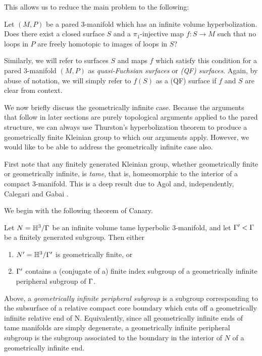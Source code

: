 This allows us to reduce the main problem to the following:

\begin{prob}

Let $(M,P)$ be a pared $3$-manifold which has an infinite volume
hyperbolization. Does there exist a closed surface $S$ and a $\pi_1$-injective
map $f \colon S \to M$ such that no loops in $P$ are freely homotopic to images
of loops in $S$?

\end{prob}

Similarly, we will refer to surfaces $S$ and maps $f$ which satisfy this
condition for a pared $3$-manifold $(M,P)$ as \emph{quasi-Fuchsian surfaces} or
\emph{(QF) surfaces}.  Again, by abuse of notation, we will simply refer to
$f(S)$ as a (QF) surface if $f$ and $S$ are clear from context.

We now briefly discuss the geometrically infinite case. Because the arguments
that follow in later sections are purely topological arguments applied to the
pared structure, we can always use Thurston's hyperbolization theorem to
produce a geometrically finite Kleinian group to which our arguments apply.
However, we would like to be able to address the geometrically infinite case
also.

First note that any finitely generated Kleinian group, whether geometrically
finite or geometrically infinite, is \emph{tame}, that is, homeomorphic to the
interior of a compact $3$-manifold. This is a deep result due to Agol
\cite{Agoltameness} and, independently, Calegari and Gabai
\cite{CalegariGabai}.

We begin with the following theorem of Canary.

\begin{thm}

Let $N = \mathbb{H}^3/\Gamma$ be an infinite volume tame hyperbolic $3$-manifold, and let
$\Gamma' < \Gamma$ be a finitely generated subgroup. Then either

\begin{enumerate}

\item $N' = \mathbb{H}^3 / \Gamma'$ is geometrically finite, or

\item $\Gamma'$ contains a (conjugate of a) finite index subgroup of
a geometrically infinite peripheral subgroup of $\Gamma$.

\end{enumerate}

Above, a \emph{geometrically infinite peripheral subgroup} is a subgroup
corresponding to the subsurface of a relative compact core boundary which cuts
off a geometrically infinite relative end of N. Equivalently, since all
geometrically infinite ends of tame manifolds are simply degenerate,
a geometrically infinite peripheral subgroup is the subgroup associated to the
boundary in the interior of $N$ of a geometrically infinite end.

\end{thm}

